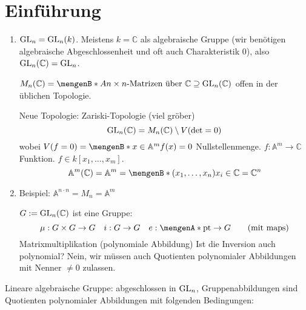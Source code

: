 \section{Einführung} %
\label{sec:0}
\begin{enumerate}[1.]
	\item $\operatorname{GL}_n = \operatorname{GL}_n(k)$. Meistens $k=\mathds{C}$ als algebraische Gruppe (wir benötigen algebraische Abgeschlossenheit und oft auch Charakteristik $0$), also 
	$\operatorname{GL}_n(\mathbb{C})= \operatorname{GL}_n$.
	
	$M_n(\mathds{C}) = \set[A]{n \times n \text{-Matrizen über } \mathds{C}}\supseteq \GL_n(\mathds{C}) $ offen in der üblichen Topologie.
	
	Neue Topologie: Zariski-Topologie (viel gröber)
	\[
		\operatorname{GL}_n(\mathbb{C}) = M_n(\mathbb{C}) \setminus V(\det=0)
	\]
	wobei $V(f=0)= \set[x \in \mathds{A}^m]{f(x)=0} $ Nullstellenmenge. $f : \mathds{A}^m \to \mathds{C}$ Funktion. $f \in k[x_1, \ldots , x_m]$.
	\[
		\mathds{A}^m(\mathds{C}) = \mathds{A}^m = \set[(x_1, \ldots , x_n)]{x_i \in \mathds{C}}= \mathds{C}^n 
	\]
	\item Beispiel: $\mathds{A}^{n \cdot n}= M_n = \mathds{A}^m$
	
	$G := \operatorname{GL}_n(\mathbb{C})$ ist eine Gruppe: 
	\[
		\mu : G \times G \to G \quad i: G \to G \quad e : \set{\mathrm{pt}} \to G \tag*{(mit maps)}
	\]
	Matrixmultiplikation (polynomiale Abbildung) Ist die Inversion auch polynomial? Nein, wir müssen auch Quotienten polynomialer Abbildungen mit Nenner $\not= 0$ zulassen.
\end{enumerate}
Lineare algebraische Gruppe: abgeschlossen in $\operatorname{GL}_n$, Gruppenabbildungen sind Quotienten polynomialer Abbildungen mit folgenden Bedingungen:
